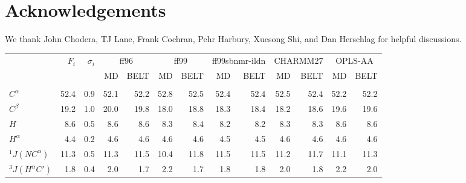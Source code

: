 \documentclass[journal=jacsat,manuscript=article]{achemso}
\begin{document}
\section*{Acknowledgements}

We thank John Chodera, TJ Lane, Frank Cochran, Pehr Harbury, Xuesong Shi, and Dan Herschlag for helpful discussions.  

\clearpage

\begin{table}

\small

\begin{tabular}{lrrrrrrrrrrrr}
\toprule
   &  $F_i$ &  $\sigma_i$ &  \multicolumn{2}{c}{ff96}             &  \multicolumn{2}{c}{ff99}    &  \multicolumn{2}{c}{ff99sbnmr-ildn}   &  \multicolumn{2}{c}{CHARMM27}       &  \multicolumn{2}{c}{OPLS-AA}               \\
   &        &             &  MD   & BELT & MD   & BELT & MD   & BELT & MD   & BELT & MD   & BELT  \\
         &      &              &          &                 &          &                 &                    &                           &           &                  &         &                \\
$C^\alpha$           & 52.4 &          0.9 &     52.1 &            52.2 &     52.8 &            52.5 &               52.4 &                      52.4 &      52.5 &             52.4 &    52.2 &           52.2 \\
$C^\beta$           & 19.2 &          1.0 &     20.0 &            19.8 &     18.0 &            18.8 &               18.3 &                      18.4 &      18.2 &             18.6 &    19.6 &           19.6 \\
$H$            &  8.6 &          0.5 &      8.6 &             8.6 &      8.3 &             8.4 &                8.2 &                       8.2 &       8.3 &              8.3 &     8.6 &            8.6 \\
$H^\alpha$           &  4.4 &          0.2 &      4.6 &             4.6 &      4.6 &             4.6 &                4.5 &                       4.5 &       4.6 &              4.6 &     4.6 &            4.6 \\
$^1J(NC^\alpha)$      & 11.3 &          0.5 &     11.3 &            11.5 &     10.4 &            11.8 &               11.5 &                      11.5 &      11.2 &             11.7 &    11.1 &           11.3 \\
$^3J(H^\alpha C\prime)$ &  1.8 &          0.4 &      2.0 &             1.7 &      2.2 &             1.7 &                1.8 &                       1.8 &       2.0 &              1.8 &     2.2 &            2.0 \\

\end{tabular}
\end{table}
\end{document}
